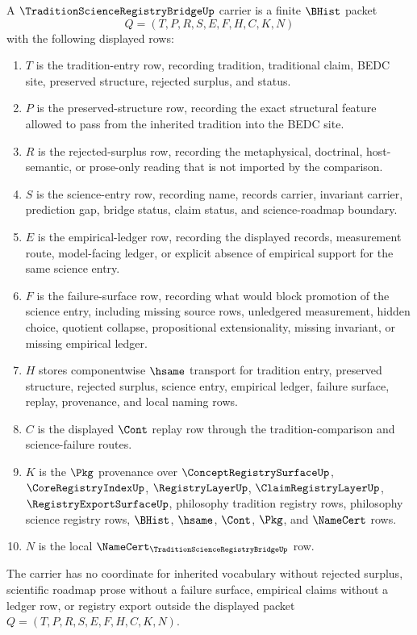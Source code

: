 \begin{definition}
\label{def:tradition-science-registry-bridge-carrier}
A $\TraditionScienceRegistryBridgeUp$ carrier is a finite $\BHist$ packet
$$
Q=(T,P,R,S,E,F,H,C,K,N)
$$
with the following displayed rows:
\begin{enumerate}
\item $T$ is the tradition-entry row, recording tradition, traditional claim, BEDC site, preserved structure, rejected surplus, and status.
\item $P$ is the preserved-structure row, recording the exact structural feature allowed to pass from the inherited tradition into the BEDC site.
\item $R$ is the rejected-surplus row, recording the metaphysical, doctrinal, host-semantic, or prose-only reading that is not imported by the comparison.
\item $S$ is the science-entry row, recording name, records carrier, invariant carrier, prediction gap, bridge status, claim status, and science-roadmap boundary.
\item $E$ is the empirical-ledger row, recording the displayed records, measurement route, model-facing ledger, or explicit absence of empirical support for the same science entry.
\item $F$ is the failure-surface row, recording what would block promotion of the science entry, including missing source rows, unledgered measurement, hidden choice, quotient collapse, propositional extensionality, missing invariant, or missing empirical ledger.
\item $H$ stores componentwise $\hsame$ transport for tradition entry, preserved structure, rejected surplus, science entry, empirical ledger, failure surface, replay, provenance, and local naming rows.
\item $C$ is the displayed $\Cont$ replay row through the tradition-comparison and science-failure routes.
\item $K$ is the $\Pkg$ provenance over $\ConceptRegistrySurfaceUp$, $\CoreRegistryIndexUp$, $\RegistryLayerUp$, $\ClaimRegistryLayerUp$, $\RegistryExportSurfaceUp$, philosophy tradition registry rows, philosophy science registry rows, $\BHist$, $\hsame$, $\Cont$, $\Pkg$, and $\NameCert$ rows.
\item $N$ is the local $\NameCert_{\TraditionScienceRegistryBridgeUp}$ row.
\end{enumerate}
The carrier has no coordinate for inherited vocabulary without rejected surplus, scientific roadmap prose without a failure surface, empirical claims without a ledger row, or registry export outside the displayed packet $Q=(T,P,R,S,E,F,H,C,K,N)$.
\end{definition}

